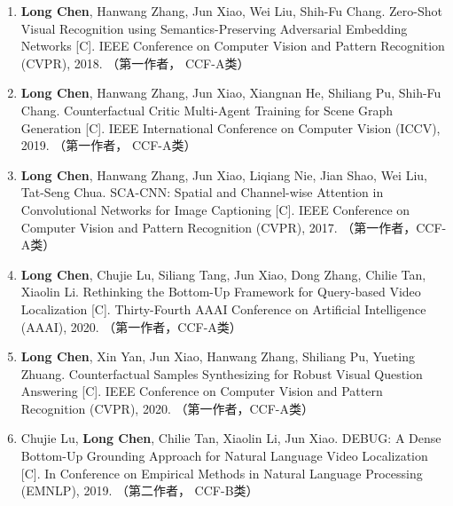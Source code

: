 \begin{publications}





\begin{enumerate}
\item{
\textbf{Long Chen}, Hanwang Zhang, Jun Xiao, Wei Liu, Shih-Fu Chang.
Zero-Shot Visual Recognition using Semantics-Preserving Adversarial Embedding Networks [C].
IEEE Conference on Computer Vision and Pattern Recognition (CVPR), 2018.
（第一作者， CCF-A类）
}

\item{
\textbf{Long Chen}, Hanwang Zhang, Jun Xiao, Xiangnan He, Shiliang Pu, Shih-Fu Chang.
Counterfactual Critic Multi-Agent Training for Scene Graph Generation [C].
IEEE International Conference on Computer Vision (ICCV), 2019.
（第一作者， CCF-A类）
}

\item{
\textbf{Long Chen}, Hanwang Zhang, Jun Xiao, Liqiang Nie, Jian Shao, Wei Liu, Tat-Seng Chua.
SCA-CNN: Spatial and Channel-wise Attention in Convolutional Networks for Image Captioning [C].
IEEE Conference on Computer Vision and Pattern Recognition (CVPR), 2017.
（第一作者，CCF-A类）
}

\item{
\textbf{Long Chen}, Chujie Lu, Siliang Tang, Jun Xiao, Dong Zhang, Chilie Tan, Xiaolin Li.
Rethinking the Bottom-Up Framework for Query-based Video Localization [C].
Thirty-Fourth AAAI Conference on Artificial Intelligence (AAAI), 2020.
（第一作者，CCF-A类）
}

\item{
\textbf{Long Chen}, Xin Yan, Jun Xiao, Hanwang Zhang, Shiliang Pu, Yueting Zhuang.
Counterfactual Samples Synthesizing for Robust Visual Question Answering [C].
IEEE Conference on Computer Vision and Pattern Recognition (CVPR), 2020.
（第一作者，CCF-A类）
}

\item{
Chujie Lu, \textbf{Long Chen}, Chilie Tan, Xiaolin Li, Jun Xiao.
DEBUG: A Dense Bottom-Up Grounding Approach for Natural Language Video Localization [C].
In Conference on Empirical Methods in Natural Language Processing (EMNLP), 2019.
（第二作者， CCF-B类）
}


\end{enumerate}
\end{publications}
